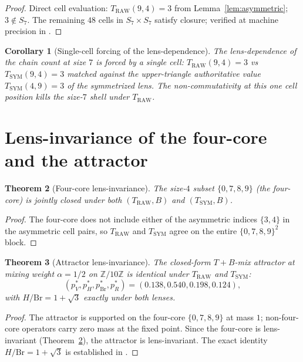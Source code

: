 \documentclass[11pt,reqno]{amsart}
\newtheorem{theorem}{Theorem}[section]
\newtheorem{corollary}[theorem]{Corollary}
\theoremstyle{definition}
\newcommand{\Z}{\mathbb{Z}}
\newcommand{\TRAW}{T_{\mathrm{RAW}}}
\newcommand{\TSYM}{T_{\mathrm{SYM}}}
\newcommand{\BHML}{B}
\begin{document}
\begin{proof}
Direct cell evaluation: $\TRAW(9, 4) = 3$ from
Lemma~\ref{lem:asymmetric}; $3 \notin S_7$. The remaining $48$
cells in $S_7 \times S_7$ satisfy closure; verified at machine
precision in \cite{Gen13WP115}.
\end{proof}

\begin{corollary}[Single-cell forcing of the lens-dependence]
\label{cor:single-cell}
The lens-dependence of the chain count at size $7$ is forced by a
single cell: $\TRAW(9, 4) = 3$ vs $\TSYM(9, 4) = 3$ matched
against the upper-triangle authoritative value $\TSYM(4, 9) = 3$
of the symmetrized lens. The non-commutativity at this one cell
position kills the size-$7$ shell under $\TRAW$.
\end{corollary}

\section{Lens-invariance of the four-core and the attractor}
\label{sec:invariance}

\begin{theorem}[Four-core lens-invariance]
\label{thm:four-core}
The size-$4$ subset $\{0, 7, 8, 9\}$ (the four-core) is jointly
closed under both $(\TRAW, \BHML)$ and $(\TSYM, \BHML)$.
\end{theorem}

\begin{proof}
The four-core does not include either of the asymmetric indices
$\{3, 4\}$ in the asymmetric cell pairs, so $\TRAW$ and $\TSYM$
agree on the entire $\{0, 7, 8, 9\}^2$ block.
\end{proof}

\begin{theorem}[Attractor lens-invariance]
\label{thm:attractor}
The closed-form $T+B$-mix attractor at mixing weight $\alpha = 1/2$
on $\Z/10\Z$ is identical under $\TRAW$ and $\TSYM$:
\[
  (p^*_V, p^*_H, p^*_{\mathrm{Br}}, p^*_R) =
  (0.138, 0.540, 0.198, 0.124),
\]
with $H/\mathrm{Br} = 1 + \sqrt{3}$ exactly under both lenses.
\end{theorem}

\begin{proof}
The attractor is supported on the four-core $\{0, 7, 8, 9\}$ at
mass $1$; non-four-core operators carry zero mass at the fixed
point. Since the four-core is lens-invariant
(Theorem~\ref{thm:four-core}), the attractor is lens-invariant.
The exact identity $H/\mathrm{Br} = 1 + \sqrt{3}$ is established
in \cite{Sanders2026Attractor}.
\end{proof}
\end{document}
